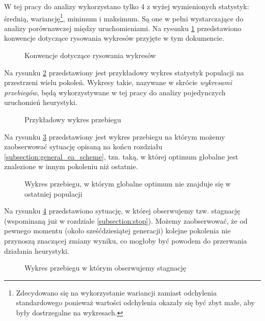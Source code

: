 \documentclass[twoside]{iisthesis}
\newcommand{\graph}[1]{}
\begin{document}
W tej pracy do analizy wykorzystano tylko 4 z wyżej wymienionych statystyk: średnią, wariancję\footnote{Zdecydowano się na wykorzystanie wariancji zamiast odchylenia standardowego ponieważ wartości odchylenia okazały się być zbyt małe, aby były dostrzegalne na wykresach.}, minimum i maksimum. Są one w pełni wystarczające do analizy porównawczej między uruchomieniami. Na rysunku \ref{plot:conventions} przedstawiono konwencje dotyczące rysowania wykresów przyjęte w tym dokumencie.

\begin{figure}[H]
	\caption{Konwencje dotyczące rysowania wykresów \label{plot:conventions}}
	\centering
	\graph{example_whiskers.tex}
\end{figure}

Na rysunku \ref{plot:random_example} przedstawiony jest przykładowy wykres statystyk populacji na przestrzeni wielu pokoleń. Wykresy takie, nazywane w skrócie \emph{wykresami przebiegów}, będą wykorzystywane w tej pracy do analizy pojedynczych uruchomień heurystyki. 

\begin{figure}[H]
	\caption{Przykładowy wykres przebiegu \label{plot:random_example}}
	\centering
	\graph{random_example.tex}
\end{figure}

Na rysunku \ref{plot:mid_opt} przedstawiony jest wykres przebiegu na którym możemy zaobserwować sytuację opisaną na końcu rozdziału \ref{subsection:general_ea_scheme}, tzn. taką, w której optimum globalne jest znalezione w innym pokoleniu niż ostatnie.

\begin{figure}[H]
	\caption{Wykres przebiegu, w którym globalne optimum nie znajduje się w ostatniej populacji \label{plot:mid_opt}}
	\centering
	\graph{mid_optimum.tex}
\end{figure}

Na rysunku \ref{plot:stagnation} przedstawiono sytuację, w której obserwujemy tzw. stagnację (wspominaną już w rozdziale \ref{subsection:stop}). Możemy zaobserwować, że od pewnego momentu (około sześćdziesiątej generacji) kolejne pokolenia nie przynoszą znaczącej zmiany wyniku, co mogłoby być powodem do przerwania działania heurystyki.

\begin{figure}[H]
	\caption{Wykres przebiegu w którym obserwujemy stagnację \label{plot:stagnation}}
	\centering
	\graph{stagnation.tex}
\end{figure}
\end{document}
